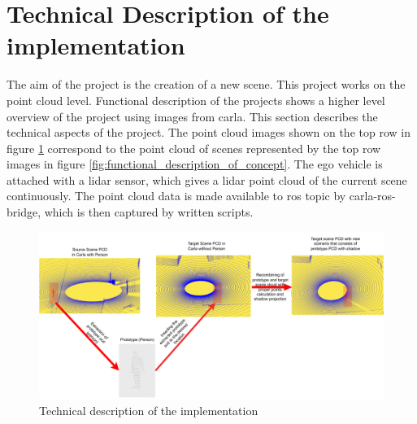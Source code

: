 \section{Technical Description of the implementation}
The aim of the project is the creation of a new scene. This project works on the point cloud level. Functional description of the projects shows a higher level overview of the project using images from \acrshort{carla}. This section describes the technical aspects of the project. The point cloud images shown on the top row in figure \ref{fig:technical_description_of_implementation} correspond to the point cloud of scenes represented by the top row images in figure \ref{fig:functional_description_of_concept}. The ego vehicle is attached with a lidar sensor, which gives a lidar point cloud of the current scene continuously. The point cloud data is made available to \acrfull{ros} topic by carla-ros-bridge, which is then captured by written scripts. 

\begin{figure}[htbp]
    \centering
    \includegraphics[width=1\linewidth]{97_graphics/concepts/technical_description_of_concept.pdf}
    \caption{Technical description of the implementation}
    \label{fig:technical_description_of_implementation}
\end{figure}

